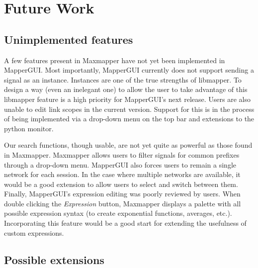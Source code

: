 \section{Future Work}
\label{sec:future_work}

	\subsection{Unimplemented features}

A few features present in Maxmapper have not yet been implemented in MapperGUI. Most importantly, MapperGUI currently does not support sending a signal as an instance. Instances are one of the true strengths of libmapper. To design a way (even an inelegant one) to allow the user to take advantage of this libmapper feature is a high priority for MapperGUI's next release. Users are also unable to edit link scopes in the current version. Support for this is in the process of being implemented via a drop-down menu on the top bar and extensions to the python monitor. 

Our search functions, though usable, are not yet quite as powerful as those found in Maxmapper. Maxmapper allows users to filter signals for common prefixes through a drop-down menu.  MapperGUI also forces users to remain a single network for each session. In the case where multiple networks are available, it would be a good extension to allow users to select and switch between them. Finally, MapperGUI's expression editing was poorly reviewed by users. When double clicking the \emph{Expression} button, Maxmapper displays a palette with all possible expression syntax (to create exponential functions, averages, etc.). Incorporating this feature would be a good start for extending the usefulness of custom expressions.


	\subsection{Possible extensions} %
	\label{sub:possible_extensions}

